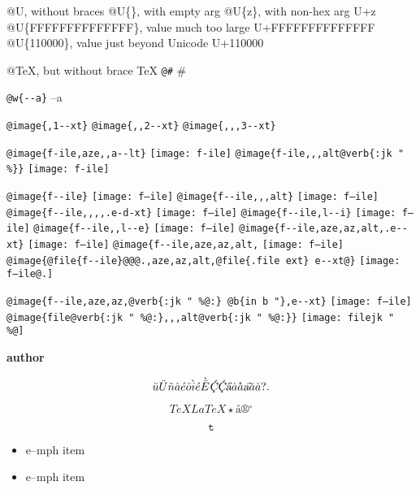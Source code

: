 \documentclass{book}
\renewcommand{\_}{\Texinfounderscore\discretionary{}{}{}}
\renewcommand{\includegraphics}[1]{\fbox{FIG \detokenize{#1}}}
\begin{document}
\begin{titlepage}
@U, without braces @U\{\}, with empty arg 
@U\{z\}, with non-hex arg U+z
@U\{FFFFFFFFFFFFFF\}, value much too large U+FFFFFFFFFFFFFF
@U\{110000\}, value just beyond Unicode U+110000

@TeX, but without brace \TeX{}
\texttt{@\#} \#

\texttt{@w\{{-}{-}a\}} \hbox{--a}

\texttt{@image\{,1{-}{-}xt\}} 
\texttt{@image\{{,}{,}2{-}{-}xt\}} 
\texttt{@image\{{,}{,},3{-}{-}xt\}} 

\texttt{@image\{f-ile,aze{,}{,}a{-}{-}lt\}} \texttt{[image: f-ile]}
\texttt{@image\{f-ile{,}{,},alt@verb\{:jk \_" \%\@\}\}} \texttt{[image: f-ile]}

\texttt{@image\{f{-}{-}ile\}} \texttt{[image: f--ile]}
\texttt{@image\{f{-}{-}ile{,}{,},alt\}} \texttt{[image: f--ile]}
\texttt{@image\{f{-}{-}ile{,}{,}{,}{,}.e-d-xt\}} \texttt{[image: f--ile]}
\texttt{@image\{f{-}{-}ile,l{-}{-}i\}} \texttt{[image: f--ile]}
\texttt{@image\{f{-}{-}ile{,}{,}l{-}{-}e\}} \texttt{[image: f--ile]}
\texttt{@image\{f{-}{-}ile,aze,az,alt,.e{-}{-}xt\}} \texttt{[image: f--ile]}
\texttt{@image\{f{-}{-}ile,aze,az,alt,} \texttt{[image: f--ile]}
\texttt{@image\{@file\{f{-}{-}ile\}@@@.,aze,az,alt,@file\{.file ext\}\ e{-}{-}xt@\}} \texttt{[image: f--ile@.]}

\texttt{@image\{f{-}{-}ile,aze,az,@verb\{:jk \_" \%@:\}\ @b\{in b "\},e{-}{-}xt\}} \texttt{[image: f--ile]}
\texttt{@image\{file@verb\{:jk \_" \%@:\}{,}{,},alt@verb\{:jk \_" \%@:\}\}} \texttt{[image: filejk \_" \\\%@]}


{\bfseries author}%

\[
\ddot{u} \ddot{U} \tilde{n} \hat{a} \acute{e} \bar{o} \grave{i} \acute{e} \grave{\bar{E}}
\textsl{\c{\'{C}}} \textsl{\c{\'{C}}} \textsl{\H{a}} \dot{a} \mathring{a} \textsl{\t{a}}
\breve{a} \check{a}
 ? .
\]

\[
TeX LaTeX \star{} \mathord{\text{\aa{}}} \circledR{} ^{\circ{}} 
\]

\[
\mathtt{t} 
\]

\begin{itemize}[label=\emph{}]
\item e--mph item
\end{itemize}

\begin{itemize}[label=\emph{} after emph]
\item e--mph item
\end{itemize}


\end{titlepage}
\end{document}
